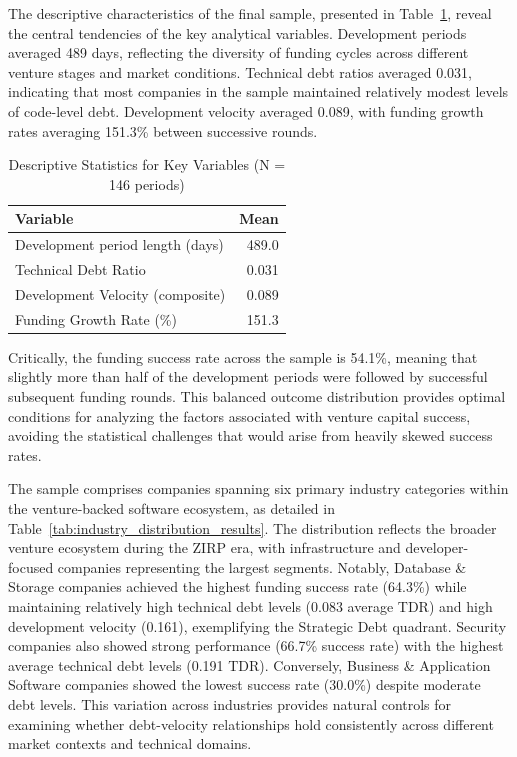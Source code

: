The descriptive characteristics of the final sample, presented in Table~\ref{tab:descriptive_stats}, reveal the central tendencies of the key analytical variables. Development periods averaged 489 days, reflecting the diversity of funding cycles across different venture stages and market conditions. Technical debt ratios averaged 0.031, indicating that most companies in the sample maintained relatively modest levels of code-level debt. Development velocity averaged 0.089, with funding growth rates averaging 151.3\% between successive rounds.

\begin{table}[htbp]
\centering
\caption{Descriptive Statistics for Key Variables (N = 146 periods)}
\label{tab:descriptive_stats}
\begin{tabular}{lr}
\hline
\textbf{Variable} & \textbf{Mean} \\
\hline
Development period length (days) & 489.0 \\
Technical Debt Ratio & 0.031 \\
Development Velocity (composite) & 0.089 \\
Funding Growth Rate (\%) & 151.3 \\
\hline
\end{tabular}
\end{table}

Critically, the funding success rate across the sample is 54.1\%, meaning that slightly more than half of the development periods were followed by successful subsequent funding rounds. This balanced outcome distribution provides optimal conditions for analyzing the factors associated with venture capital success, avoiding the statistical challenges that would arise from heavily skewed success rates.

The sample comprises companies spanning six primary industry categories within the venture-backed software ecosystem, as detailed in Table~\ref{tab:industry_distribution_results}. The distribution reflects the broader venture ecosystem during the \ac{ZIRP} era, with infrastructure and developer-focused companies representing the largest segments. Notably, Database \& Storage companies achieved the highest funding success rate (64.3\%) while maintaining relatively high technical debt levels (0.083 average TDR) and high development velocity (0.161), exemplifying the Strategic Debt quadrant. Security companies also showed strong performance (66.7\% success rate) with the highest average technical debt levels (0.191 \ac{TDR}). Conversely, Business \& Application Software companies showed the lowest success rate (30.0\%) despite moderate debt levels. This variation across industries provides natural controls for examining whether debt-velocity relationships hold consistently across different market contexts and technical domains.

